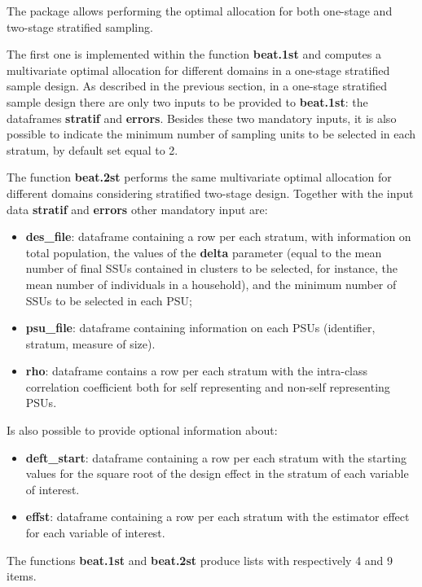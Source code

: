 The package allows performing the optimal allocation for both one-stage and two-stage stratified sampling.

The first one is implemented within the function \textbf{beat.1st} and computes a multivariate optimal allocation for different domains in a one-stage stratified sample design.
As described in the previous section, in a one-stage stratified sample design there are only two inputs to be provided to \textbf{beat.1st}: the dataframes \textbf{stratif} and \textbf{errors}. Besides these two mandatory inputs, it is also possible to indicate the minimum number of sampling units to be selected in each stratum, by default set equal to 2.

The function \textbf{beat.2st} performs the same multivariate optimal allocation for different domains considering stratified two-stage design. 
Together with the input data \textbf{stratif} and \textbf{errors} other mandatory input are: 

\begin{itemize}
	\item \textbf{des\_file}: dataframe containing a row per each stratum, with information on total population, the values of the \textbf{delta} parameter (equal to the mean number of final SSUs contained in clusters to be selected, for instance, the mean number of individuals in a household), and the minimum number of SSUs to be selected in each PSU;
	\item \textbf{psu\_file}: dataframe containing information on each PSUs (identifier, stratum, measure of size).
	\item \textbf{rho}: dataframe contains a row per each stratum with the intra-class correlation coefficient both for self representing and non-self representing PSUs.
\end{itemize}

Is also possible to provide optional information about:

\begin{itemize}
	\item \textbf{deft\_start}: dataframe containing a row per each stratum with the starting values for the square root of the design effect in the stratum of each variable of interest.
	\item \textbf{effst}: dataframe containing a row per each stratum with the estimator effect for each variable of interest.
\end{itemize}

The functions \textbf{beat.1st} and \textbf{beat.2st} produce lists with respectively 4 and 9 items. 

